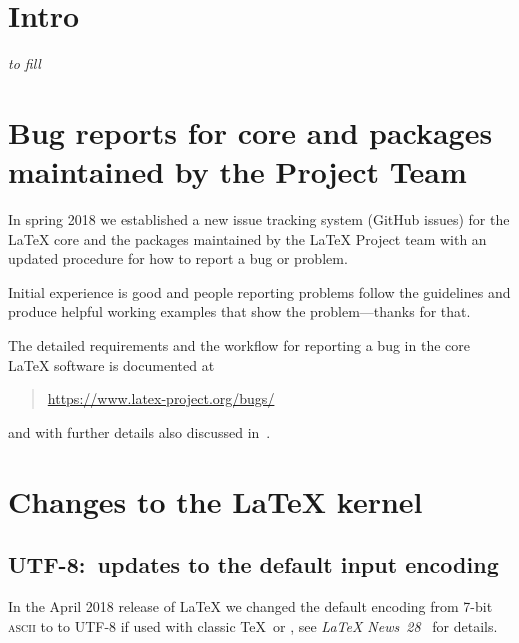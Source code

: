 \documentclass{ltnews}
\providecommand\acro[1]{\textsc{#1}}
\begin{document}
\maketitle
\tableofcontents

\setlength{}

\section{Intro}

\emph{to fill}

\section[Bug reports for core \LaTeXe{} and packages]
        {Bug reports for core \LaTeXe{} and packages maintained by the Project Team}



In spring 2018 we established a new issue tracking system (GitHub
issues) for the \LaTeX{} core and the packages maintained by the
\LaTeX{} Project team with an updated procedure for how to report a bug or
problem.

Initial experience is good and people reporting problems follow the
guidelines and produce helpful working examples that show the
problem---thanks for that.

The detailed requirements and the workflow for reporting a bug in the
core \LaTeX{} software is documented at
\begin{quote}
\url{https://www.latex-project.org/bugs/}
\end{quote}
and with further details also discussed in~\cite{Mittelbach:TB39-1}.


\section{Changes to the \LaTeX{} kernel}


\subsection{UTF-8:\ updates to the default input encoding}

In the April 2018 release of \LaTeX{} we changed the default encoding
from 7-bit \acro{ascii} to to UTF-8 if used with classic \TeX\ or
, see \textit{\LaTeX{} News~28}~\cite{ltnews28} for
details.
\end{document}
